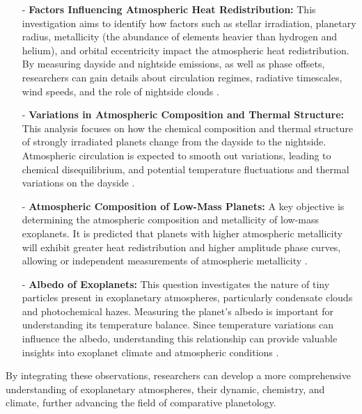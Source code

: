 \documentclass[12pt]{article}
\begin{document}
\begin{itemize}
    \item[-] \textbf{Factors Influencing Atmospheric Heat Redistribution:} This investigation aims to identify how factors such as stellar irradiation, planetary radius, metallicity (the abundance of elements heavier than hydrogen and helium), and orbital eccentricity
    impact the atmospheric heat redistribution. By measuring dayside and nightside emissions, as well as phase offsets, researchers can gain details about circulation regimes, radiative timescales, wind speeds, and the role of nightside clouds \cite{arielstudyreport}.
    \item[-] \textbf{Variations in Atmospheric Composition and Thermal Structure:} This analysis focuses on how the chemical composition and thermal structure of strongly irradiated planets change from the dayside to the nightside. Atmospheric circulation is expected to smooth
    out variations, leading to chemical disequilibrium, and potential temperature fluctuations and thermal variations on the dayside \cite{arielstudyreport}.
    \item[-] \textbf{Atmospheric Composition of Low-Mass Planets:} A key objective is determining the atmospheric composition and metallicity of low-mass exoplanets. It is predicted that planets with higher atmospheric metallicity will exhibit greater heat redistribution and higher
    amplitude phase curves, allowing or independent measurements of atmospheric metallicity \cite{arielstudyreport}.
    \item[-] \textbf{Albedo of Exoplanets:} This question investigates the nature of tiny particles present in exoplanetary atmospheres, particularly condensate clouds and photochemical hazes. Measuring the planet's albedo is important for understanding its temperature balance.
    Since temperature variations can influence the albedo, understanding this relationship can provide valuable insights into exoplanet climate and atmospheric conditions \cite{arielstudyreport}.
\end{itemize}

By integrating these observations, researchers can develop a more comprehensive understanding of exoplanetary atmospheres, their dynamic, chemistry, and climate, further advancing the field of comparative planetology.
\end{document}
